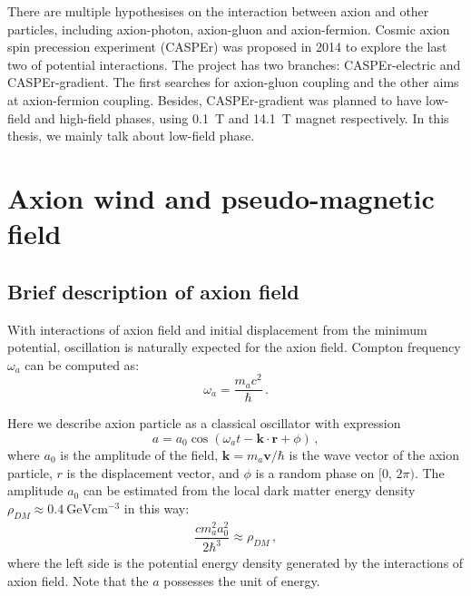 There are multiple hypothesises on the interaction between axion and other particles\cite{GrahamNewobservables_PhysRevD.88.035023}, including axion-photon, axion-gluon and axion-fermion. Cosmic axion spin precession experiment (CASPEr) was proposed in 2014\cite{budkergrahamproposal} to explore the last two of potential interactions. 
The project has two branches: CASPEr-electric and CASPEr-gradient. The first searches for axion-gluon coupling and the other aims at axion-fermion coupling. Besides, CASPEr-gradient was planned to have low-field and high-field phases, using \SI{0.1}{\tesla} and \SI{14.1}{\tesla} magnet respectively. In this thesis, we mainly talk about low-field phase. 

\section{Axion wind and pseudo-magnetic field}\label{sec:Axion_wind}

\subsection{Brief description of axion field}\label{sec:Axion_wind:description}

With interactions of axion field and initial displacement from the minimum potential, oscillation is naturally expected for the axion field. Compton frequency $\omega_a$ can be computed as:
\begin{equation}\label{eq:axion_omega_ma}
    \omega_a = \dfrac{m_a c^2}{\hbar}\,. 
\end{equation}

Here we describe axion particle as a classical oscillator with expression
\begin{equation}
    a = a_0 \cos(\omega_a t - \mathbf{k}\cdot \mathbf{r} + \phi)\label{eq:axion_field}\,,
\end{equation}
where $a_0$ is the amplitude of the field, $\mathbf{k} = m_a \mathbf{v}/\hbar$ is the wave vector of the axion particle, $r$ is the displacement vector, and $\phi$ is a random phase on $[0,\, 2\pi)$. The amplitude $a_0$ can be estimated from the local dark matter energy density $\rho_{DM} \approx \SI{0.4}{\GeV \cm^{-3}}$\cite{BERGSTROM1998137, Jungman1992SupersymmetricDM, Sofue_RotationCurves} in this way:
% 
\begin{align}
    \dfrac{c m_a^2 a_0^2}{2\hbar^3} \approx \rho_{DM}\,,\label{eq:a0estimation} 
\end{align}
where the left side is the potential energy density generated by the interactions of axion field. Note that the $a$ possesses the unit of energy. 

